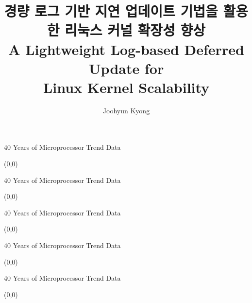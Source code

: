 \documentclass[english]{beamer} %
\begin{document}
\title[Memory Scalability]{
경량 로그 기반 지연 업데이트 기법을 활용한 리눅스 커널 확장성 향상 \\
\small{A Lightweight Log-based Deferred Update
for \\Linux Kernel Scalability}}

\author{Joohyun Kyong}


\begin{frame}
  \titlepage
\end{frame}

\begin{frame}{40 Years of Microprocessor Trend Data}
\begin{textblock}{1}(0,0)
\end{textblock}
\end{frame}


\begin{frame}{40 Years of Microprocessor Trend Data}
\begin{textblock}{1}(0,0)
\end{textblock}
\end{frame}

\begin{frame}{40 Years of Microprocessor Trend Data}
\begin{textblock}{1}(0,0)
\end{textblock}
\end{frame}


\begin{frame}{40 Years of Microprocessor Trend Data}
\begin{textblock}{1}(0,0)
\end{textblock}
\end{frame}

\begin{frame}{40 Years of Microprocessor Trend Data}
\begin{textblock}{1}(0,0)
\end{textblock}
\end{frame}
\end{document}
